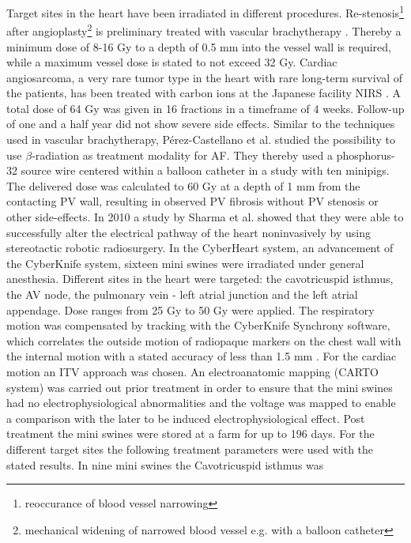 \documentclass[type=dr, dr=rernat, accentcolor=tud7b,colorbacktitle, bigchapter, openright, twoside, 12pt ]{tudthesis}
\begin{document}
Target sites in the heart have been irradiated in different procedures. Re-stenosis\footnote{reoccurance of blood vessel narrowing} after 
angioplasty\footnote{mechanical widening of narrowed blood vessel e.g. with a balloon catheter} is preliminary treated with vascular 
brachytherapy \cite{Nat99} \cite{Cot05}. Thereby a minimum dose of 8-16 Gy to a depth of 0.5 mm into the vessel wall is required, while a 
maximum vessel dose is stated to not exceed 32 Gy. Cardiac angiosarcoma, a very rare tumor type in the heart with rare long-term 
survival of the patients, has been treated with carbon ions at the Japanese facility NIRS \cite{Aok04}. A total dose of 64 Gy was given in 16 
fractions in a timeframe of 4 weeks. Follow-up of one and a half year did not show severe side effects.\newline
\newline
Similar to the techniques used in vascular brachytherapy, P\'erez-Castellano et al. \cite{Per06} studied the possibility to use $\beta$-radiation 
as treatment modality for AF. They thereby used a phosphorus-32 source wire centered within a balloon catheter in a study with ten minipigs. 
The delivered dose was calculated to 60 Gy at a depth of 1 mm from the contacting PV wall, resulting in observed PV fibrosis without PV stenosis 
or other side-effects.
\newpage
In 2010 a study by Sharma et al. \cite{Sha10} showed that they were able to successfully alter the electrical pathway of the heart 
noninvasively by using stereotactic robotic radiosurgery. In the CyberHeart system, an advancement of the CyberKnife system, 
sixteen mini swines were irradiated under general anesthesia. Different sites in the heart were targeted: the cavotricuspid isthmus, 
the AV node, the pulmonary vein - left atrial junction and the left atrial appendage. Dose ranges from 25 Gy to 50 Gy were applied. 
The respiratory motion was compensated by tracking with the CyberKnife Synchrony software, which correlates the outside motion of 
radiopaque markers on the chest wall with the internal motion with a stated accuracy of less than 1.5 mm \cite{Ozh08}. For the cardiac 
motion an ITV approach was chosen. An electroanatomic mapping (CARTO system) was carried out prior treatment in order to ensure that the 
mini swines had no electrophysiological abnormalities and the voltage was mapped to enable a comparison with the later to 
be induced electrophysiological effect. Post treatment the mini swines were stored at a farm for up to 196 days. For the different 
target sites the following treatment parameters were used with the stated results. In nine mini swines the Cavotricuspid isthmus was 
\end{document}
